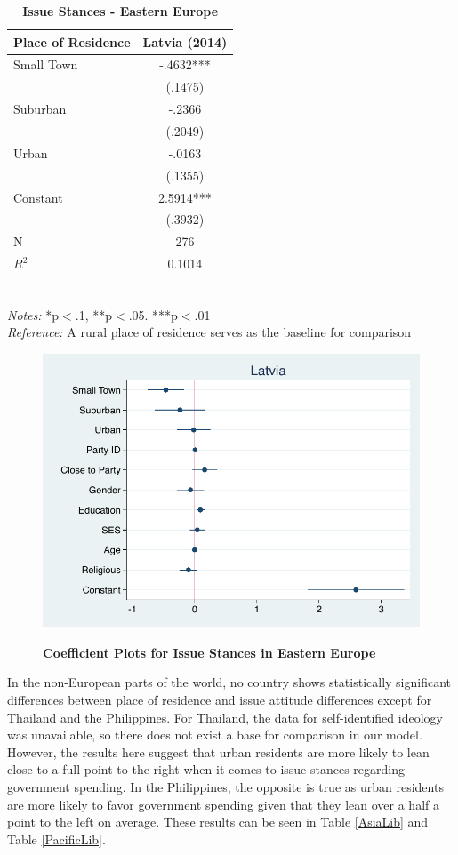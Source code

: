 \documentclass[12pt, titlepage]{article}
\newcommand\e{\emph}
\newcommand\tb{\textbf}
\begin{document}
\begin{singlespace}
	\begin{table}[H]
		\centering
		\caption{\tb{Issue Stances - Eastern Europe}}
		\begin{tabulary}{\linewidth}{l c }

			\hline
			\tb{Place of Residence} & \tb{Latvia (2014)}  \\
			\hline
			Small Town& -.4632*** \\
			&(.1475)\\
			Suburban&-.2366\\
			&(.2049)\\
			Urban&-.0163\\
			&(.1355)\\
			Constant&2.5914***\\
			&(.3932)\\
			N&276\\
			$R^2$&0.1014\\
			\hline
\end{tabulary}
\\
\e{Notes:} *p$<$.1, **p$<$.05. ***p$<$.01 \\
\e{Reference:} A rural place of residence serves as the baseline for comparison
\label{EastELib}
\end{table}
\end{singlespace}


\begin{figure}[H]    \centering
	{	 \includegraphics[width=.5\textwidth]{LibCoef/Latvia}}
	\caption[ \tb{Issue Stances - Eastern Europe} ]
	{\tb {Coefficient Plots for Issue Stances in Eastern Europe} }
	\label{EastEuroLibCoef}
\end{figure}


In the non-European parts of the world, no country shows statistically significant differences between place of residence and issue attitude differences except for Thailand and the Philippines. For Thailand, the data for self-identified ideology was unavailable, so there does not exist a base for comparison in our model. However, the results here suggest that urban residents are more likely to lean close to a full point to the right when it comes to issue stances regarding government spending. In the Philippines, the opposite is true as urban residents are more likely to favor government spending given that they lean over a half a point to the left on average. These results can be seen in Table \ref{AsiaLib} and Table \ref{PacificLib}.
\end{document}
